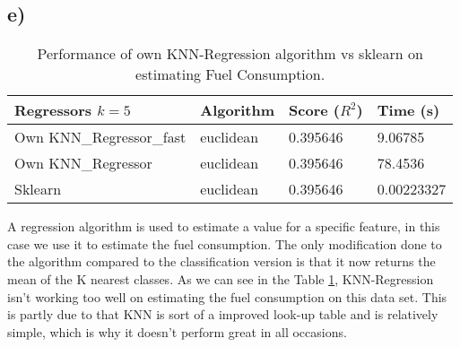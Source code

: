 \documentclass{article}
\begin{document}
        \subsection{e)}
          \begin{table}[h]
            \centering
            \label{tbl:task1e}
            \begin{tabular}{llll}
              \toprule
              {Regressors $k=5$} &  Algorithm &     Score ($R^2$)&    Time (s) \\
              \midrule
              Own KNN\_Regressor\_fast &  euclidean &  0.395646 &     9.06785 \\
              Own KNN\_Regressor      &  euclidean &  0.395646 &     78.4536 \\
              Sklearn                &  euclidean &  0.395646 &  0.00223327 \\
              \bottomrule
            \end{tabular}
            \caption{Performance of own KNN-Regression algorithm vs sklearn on estimating Fuel Consumption.}
          \end{table}
          A regression algorithm is used to estimate a value for a specific feature, in this case we use it to estimate the fuel consumption. 
          The only modification done to the algorithm compared to the classification version is that it now returns the mean of the K nearest classes. 
          As we can see in the Table \ref{tbl:task1e}, KNN-Regression isn't working too well on estimating the
          fuel consumption on this data set. This is partly due to that KNN is sort of a improved look-up table 
          and is relatively simple, which is why it doesn't perform great in all occasions.
\end{document}

